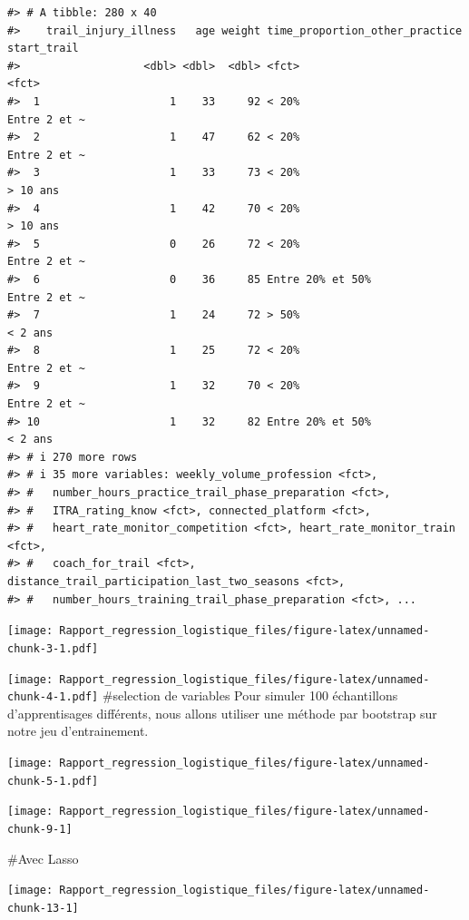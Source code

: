 \documentclass[
]{article}
\let\origfigure\figure
\let\endorigfigure\endfigure
\renewenvironment{figure}[1][2]{
    \expandafter\origfigure\expandafter[H]
} {
    \endorigfigure
}
\begin{document}
\begin{verbatim}
#> # A tibble: 280 x 40
#>    trail_injury_illness   age weight time_proportion_other_practice start_trail 
#>                   <dbl> <dbl>  <dbl> <fct>                          <fct>       
#>  1                    1    33     92 < 20%                          Entre 2 et ~
#>  2                    1    47     62 < 20%                          Entre 2 et ~
#>  3                    1    33     73 < 20%                          > 10 ans    
#>  4                    1    42     70 < 20%                          > 10 ans    
#>  5                    0    26     72 < 20%                          Entre 2 et ~
#>  6                    0    36     85 Entre 20% et 50%               Entre 2 et ~
#>  7                    1    24     72 > 50%                          < 2 ans     
#>  8                    1    25     72 < 20%                          Entre 2 et ~
#>  9                    1    32     70 < 20%                          Entre 2 et ~
#> 10                    1    32     82 Entre 20% et 50%               < 2 ans     
#> # i 270 more rows
#> # i 35 more variables: weekly_volume_profession <fct>,
#> #   number_hours_practice_trail_phase_preparation <fct>,
#> #   ITRA_rating_know <fct>, connected_platform <fct>,
#> #   heart_rate_monitor_competition <fct>, heart_rate_monitor_train <fct>,
#> #   coach_for_trail <fct>, distance_trail_participation_last_two_seasons <fct>,
#> #   number_hours_training_trail_phase_preparation <fct>, ...
\end{verbatim}

\texttt{[image: Rapport\_regression\_logistique\_files/figure-latex/unnamed-chunk-3-1.pdf]}

\texttt{[image: Rapport\_regression\_logistique\_files/figure-latex/unnamed-chunk-4-1.pdf]}
\#selection de variables Pour simuler 100 échantillons d'apprentisages
différents, nous allons utiliser une méthode par bootstrap sur notre jeu
d'entrainement.

\texttt{[image: Rapport\_regression\_logistique\_files/figure-latex/unnamed-chunk-5-1.pdf]}

\begin{figure}

{\centering \texttt{[image: Rapport\_regression\_logistique\_files/figure-latex/unnamed-chunk-9-1]} 

}

\caption{Histogramme des occurances des variables avec la méthode lasso}\label{fig:unnamed-chunk-9}
\end{figure}

\#Avec Lasso

\begin{figure}

{\centering \texttt{[image: Rapport\_regression\_logistique\_files/figure-latex/unnamed-chunk-13-1]} 

}

\caption{Histogramme des occurances des variables avec la méthode lasso}\label{fig:unnamed-chunk-13}
\end{figure}
\end{document}
